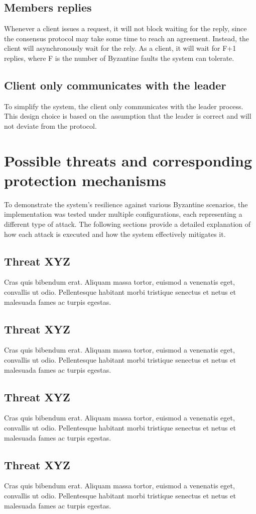 \documentclass[runningheads]{llncs}
\begin{document}
\subsection{Members replies}
Whenever a client issues a request, it will not block waiting for the reply,
since the consensus protocol may take some time to reach an agreement. Instead,
the client will asynchronously wait for the rely. As a client, it will wait for 
F+1 replies, where F is the number of Byzantine faults the system can tolerate.
%
\subsection{Client only communicates with the leader}
To simplify the system, the client only communicates with the leader process.
This design choice is based on the assumption that the leader is correct and
will not deviate from the protocol.
%
\section{Possible threats and corresponding protection mechanisms} To
demonstrate the system's resilience against various Byzantine scenarios, the
implementation was tested under multiple configurations, each representing a
different type of attack. The following sections provide a detailed explanation
of how each attack is executed and how the system effectively mitigates it.
\subsection{Threat XYZ}
Cras quis bibendum erat. Aliquam massa tortor, euismod a venenatis eget,
convallis ut odio. Pellentesque habitant morbi tristique senectus et netus et
malesuada fames ac turpis egestas.
%
\subsection{Threat XYZ}
Cras quis bibendum erat. Aliquam massa tortor, euismod a venenatis eget,
convallis ut odio. Pellentesque habitant morbi tristique senectus et netus et
malesuada fames ac turpis egestas.
%
\subsection{Threat XYZ}
Cras quis bibendum erat. Aliquam massa tortor, euismod a venenatis eget,
convallis ut odio. Pellentesque habitant morbi tristique senectus et netus et
malesuada fames ac turpis egestas.
%
\subsection{Threat XYZ}
Cras quis bibendum erat. Aliquam massa tortor, euismod a venenatis eget,
convallis ut odio. Pellentesque habitant morbi tristique senectus et netus et
malesuada fames ac turpis egestas.
%
\end{document}
